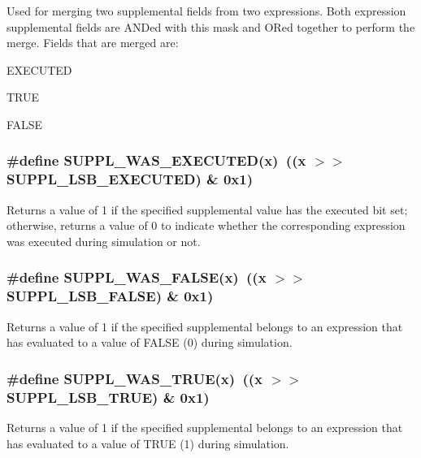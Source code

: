 Used for merging two supplemental fields from two expressions. Both expression supplemental fields are ANDed with this mask and ORed together to perform the merge. Fields that are merged are:\begin{CompactItemize}
\item 
EXECUTED\item 
TRUE\item 
FALSE \end{CompactItemize}
\subsubsection{\setlength{\rightskip}{0pt plus 5cm}\#define SUPPL\_\-WAS\_\-EXECUTED(x)\ ((x $>$$>$ SUPPL\_\-LSB\_\-EXECUTED) \& 0x1)}\label{group__expr__suppl_a8}


Returns a value of 1 if the specified supplemental value has the executed bit set; otherwise, returns a value of 0 to indicate whether the corresponding expression was executed during simulation or not. 
\subsubsection{\setlength{\rightskip}{0pt plus 5cm}\#define SUPPL\_\-WAS\_\-FALSE(x)\ ((x $>$$>$ SUPPL\_\-LSB\_\-FALSE) \& 0x1)}\label{group__expr__suppl_a11}


Returns a value of 1 if the specified supplemental belongs to an expression that has evaluated to a value of FALSE (0) during simulation. 
\subsubsection{\setlength{\rightskip}{0pt plus 5cm}\#define SUPPL\_\-WAS\_\-TRUE(x)\ ((x $>$$>$ SUPPL\_\-LSB\_\-TRUE) \& 0x1)}\label{group__expr__suppl_a10}


Returns a value of 1 if the specified supplemental belongs to an expression that has evaluated to a value of TRUE (1) during simulation. 